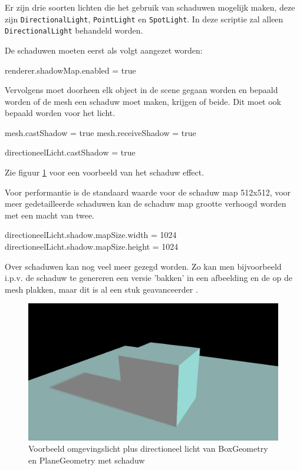 Er zijn drie soorten lichten die het gebruik van schaduwen mogelijk maken, deze zijn \texttt{DirectionalLight}, \texttt{PointLight} en \texttt{SpotLight}. In deze scriptie zal alleen \texttt{DirectionalLight} behandeld worden.

De schaduwen moeten eerst als volgt aangezet worden:

\begin{LVerbatim}
renderer.shadowMap.enabled = true
\end{LVerbatim}

Vervolgens moet doorheen elk object in de scene gegaan worden en bepaald worden of de mesh een schaduw moet maken, krijgen of beide. Dit moet ook bepaald worden voor het licht.

\begin{LVerbatim}
mesh.castShadow = true
mesh.receiveShadow = true

directioneelLicht.castShadow = true
\end{LVerbatim}

Zie figuur \ref{fig:shadow} voor een voorbeeld van het schaduw effect.

Voor performantie is de standaard waarde voor de schaduw map 512x512, voor meer gedetailleerde schaduwen kan de schaduw map grootte verhoogd worden met een macht van twee.

\begin{LVerbatim}
directioneelLicht.shadow.mapSize.width = 1024
directioneelLicht.shadow.mapSize.height = 1024
\end{LVerbatim}

Over schaduwen kan nog veel meer gezegd worden. Zo kan men bijvoorbeeld i.p.v. de schaduw te genereren een versie 'bakken' in een afbeelding en de op de mesh plakken, maar dit is al een stuk geavanceerder \autocite{Simon2023}.

\begin{figure}
	\centering
	\includegraphics[width=1\linewidth]{graphics/shadow}
	\caption[Voorbeeld omgevingslicht plus directioneel licht van BoxGeometry en PlaneGeometry met schaduw]{Voorbeeld omgevingslicht plus directioneel licht van BoxGeometry en PlaneGeometry met schaduw}
	\label{fig:shadow}
\end{figure}

